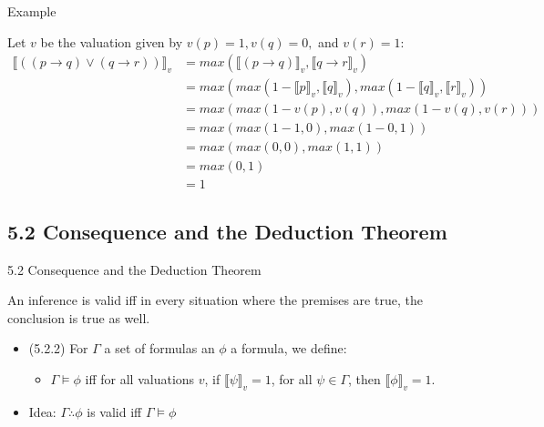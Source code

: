 \begin{frame}{Example}

Let $v$ be the valuation given by $v(p)=1,v(q)=0,$ and $v(r)=1$:
{\small	
		\begin{align*}
		\llbracket ((p\to q)\lor (q\to r))\rrbracket_v &=max(\llbracket (p\to q)\rrbracket_v, \llbracket q\to r\rrbracket_v)\\
		&=max(max(1-\llbracket p\rrbracket_v, \llbracket q\rrbracket_v), max(1-\llbracket q\rrbracket_v, \llbracket r\rrbracket_v))\\
		&=max(max(1-v(p), v(q)), max(1-v(q), v(r)))\\
		&=max(max(1-1, 0), max(1-0, 1))\\
		&=max(max(0, 0), max(1,1))\\
		&=max(0,1)\\
		&=1
		\end{align*}}

\end{frame}

\subsection{5.2 Consequence and the Deduction Theorem}	
\begin{frame}{5.2 Consequence and the Deduction Theorem}	

	\begin{center}
	An inference is valid iff in every situation where the premises are true, the conclusion is true as well.
	\end{center}

	\begin{itemize}
	
		\item (5.2.2) For $\Gamma$ a set of formulas an $\phi$ a formula, we define:
		
		\begin{itemize}
		
			\item $\Gamma\vDash\phi$ iff for all valuations $v$, if $\llbracket\psi\rrbracket_v=1$, for all $\psi\in\Gamma$, then $\llbracket\phi\rrbracket_v=1$.
		
		\end{itemize}
		
		\item Idea: $\Gamma\therefore\phi$ is valid iff $\Gamma\vDash\phi$
	
	\end{itemize}

\end{frame}

